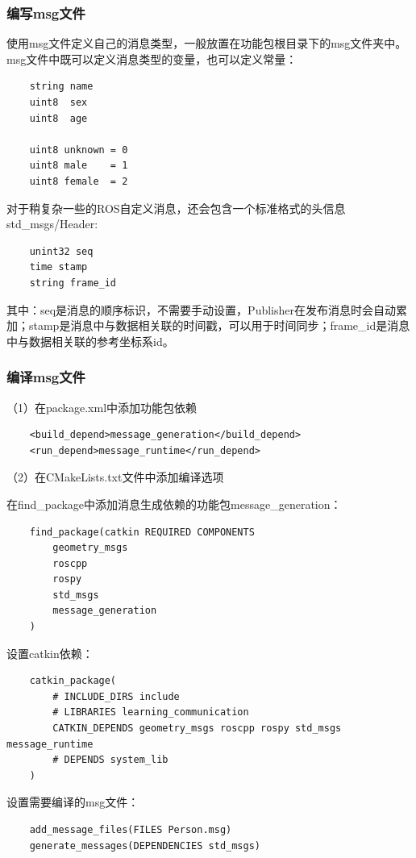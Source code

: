 \documentclass[9pt, oneside]{book}
\begin{document}
\subsubsection{编写msg文件}

使用msg文件定义自己的消息类型，一般放置在功能包根目录下的msg文件夹中。msg文件中既可以定义消息类型的变量，也可以定义常量：

\begin{verbatim}
    string name
    uint8  sex
    uint8  age
    
    uint8 unknown = 0
    uint8 male    = 1
    uint8 female  = 2
\end{verbatim}

对于稍复杂一些的ROS自定义消息，还会包含一个标准格式的头信息std\_msgs/Header:
\begin{verbatim}
    unint32 seq
    time stamp
    string frame_id  
\end{verbatim}

其中：seq是消息的顺序标识，不需要手动设置，Publisher在发布消息时会自动累加；stamp是消息中与数据相关联的时间戳，可以用于时间同步；frame\_id是消息中与数据相关联的参考坐标系id。

\subsubsection{编译msg文件}

（1）在package.xml中添加功能包依赖

\begin{verbatim}
    <build_depend>message_generation</build_depend>
    <run_depend>message_runtime</run_depend>
\end{verbatim}

（2）在CMakeLists.txt文件中添加编译选项

在find\_package中添加消息生成依赖的功能包message\_generation：
\begin{verbatim}
    find_package(catkin REQUIRED COMPONENTS
        geometry_msgs
        roscpp
        rospy
        std_msgs
        message_generation
    )
\end{verbatim}

设置catkin依赖：
\begin{verbatim}
    catkin_package(
        # INCLUDE_DIRS include
        # LIBRARIES learning_communication
        CATKIN_DEPENDS geometry_msgs roscpp rospy std_msgs message_runtime
        # DEPENDS system_lib
    )
\end{verbatim}

设置需要编译的msg文件：
\begin{verbatim}
    add_message_files(FILES Person.msg) 
    generate_messages(DEPENDENCIES std_msgs)
\end{verbatim}
\end{document}
